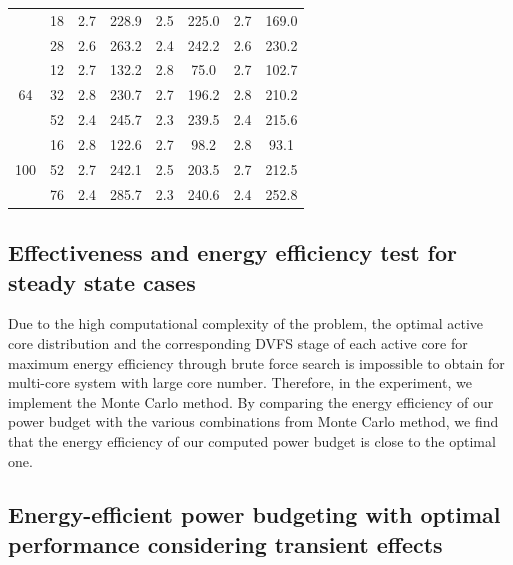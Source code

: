 \begin{table}
\begin{tabular}{c|c||c|c||c|c||c|c}
              &     18            &     2.7         & 228.9    &  2.5   &    225.0   &  2.7  & 169.0 \\
              &     28          &        2.6      &   263.2    &  2.4   &    242.2   &  2.6 & 230.2 \\
     \hline
 \multirow{3}{*}{64}   &     12           &     2.7  & 132.2   &   2.8    &  75.0   & 2.7   & 102.7  \\
              &     32      &      2.8      &     230.7     &   2.7    & 196.2   & 2.8   & 210.2  \\
              &     52        &      2.4       & 245.7       &   2.3    &     239.5  & 2.4   & 215.6   \\
              
 \hline 
 \multirow{3}{*}{100} & 16 & 2.8 &  122.6   &   2.7  &  98.2   &   2.8   &   93.1  \\
                      & 52 & 2.7 &  242.1   &   2.5 &  203.5   &   2.7   &   212.5  \\
                      & 76 & 2.4 &  285.7   &  2.3   &  240.6   &   2.4   &   252.8  \\
\hline
  
\end{tabular}
\end{table}

\subsection{Effectiveness and energy efficiency test for steady state cases}
Due to the high computational complexity of the problem, the optimal active core distribution and the corresponding DVFS stage of each active core for maximum energy efficiency through brute force search is impossible to obtain for multi-core system with large core number. Therefore, in the experiment, we implement the Monte Carlo method. By comparing the energy efficiency of our power budget with the various combinations from Monte Carlo method, we find that the energy efficiency of our computed power budget is close to the optimal one.



\subsection{Energy-efficient power budgeting with optimal performance considering transient effects}

